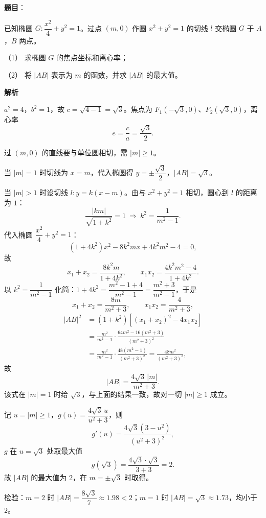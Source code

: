 \begin{answer}

\textbf{题目}：

已知椭圆 $G:\dfrac{x^2}{4}+y^2=1$。过点 $(m,0)$ 作圆 $x^2+y^2=1$ 的切线 $l$ 交椭圆 $G$ 于 $A$，$B$ 两点。

（1） 求椭圆 $G$ 的焦点坐标和离心率；

（2） 将 $|AB|$ 表示为 $m$ 的函数，并求 $|AB|$ 的最大值。

\textbf{解析}


$a^2=4$，$b^2=1$，故 $c=\sqrt{4-1}=\sqrt3$。焦点为 $F_1(-\sqrt3,0)$、$F_2(\sqrt3,0)$，离心率
\nopagebreak[4]
\[
e=\frac ca=\frac{\sqrt3}{2}.
\]


过 $(m,0)$ 的直线要与单位圆相切，需 $|m|\geqslant1$。

当 $|m|=1$ 时切线为 $x=m$，代入椭圆得 $y=\pm\dfrac{\sqrt3}{2}$，$|AB|=\sqrt3$。

当 $|m|>1$ 时设切线 $l:y=k(x-m)$。由与 $x^2+y^2=1$ 相切，圆心到 $l$ 的距离为 $1$：
\nopagebreak[4]
\[
\frac{|km|}{\sqrt{1+k^2}}=1\ \Longrightarrow\ k^2=\frac1{m^2-1}.
\]
代入椭圆 $\dfrac{x^2}{4}+y^2=1$：
\nopagebreak[4]
\[
\left(1+4k^2\right)x^2-8k^2mx+4k^2m^2-4=0,
\]
故
\nopagebreak[4]
\[
x_1+x_2=\frac{8k^2m}{1+4k^2},\qquad x_1x_2=\frac{4k^2m^2-4}{1+4k^2}.
\]
以 $k^2=\dfrac1{m^2-1}$ 化简：$1+4k^2=\dfrac{m^2-1+4}{m^2-1}=\dfrac{m^2+3}{m^2-1}$，于是
\nopagebreak[4]
\[
x_1+x_2=\frac{8m}{m^2+3},\qquad x_1x_2=\frac{4}{m^2+3},
\]
\nopagebreak[4]
\[
\begin{aligned}
|AB|^2&=(1+k^2)\left[(x_1+x_2)^2-4x_1x_2\right]\\
&=\frac{m^2}{m^2-1}\cdot\frac{64m^2-16(m^2+3)}{(m^2+3)^2}\\
&=\frac{m^2}{m^2-1}\cdot\frac{48(m^2-1)}{(m^2+3)^2}
=\frac{48m^2}{(m^2+3)^2},
\end{aligned}
\]
故
\nopagebreak[4]
\[
|AB|=\frac{4\sqrt3\,|m|}{m^2+3}.
\]
该式在 $|m|=1$ 时给 $\sqrt3$，与上面的结果一致，故对一切 $|m|\geqslant1$ 成立。

记 $u=|m|\geqslant1$，$g(u)=\dfrac{4\sqrt3\,u}{u^2+3}$，则
\nopagebreak[4]
\[
g'(u)=\frac{4\sqrt3\left(3-u^2\right)}{(u^2+3)^2},
\]
$g$ 在 $u=\sqrt3$ 处取最大值
\nopagebreak[4]
\[
g(\sqrt3)=\frac{4\sqrt3\cdot\sqrt3}{3+3}=2.
\]
故 $|AB|$ 的最大值为 $2$，在 $m=\pm\sqrt3$ 时取得。

检验：$m=2$ 时 $|AB|=\dfrac{8\sqrt3}{7}\approx1.98<2$；$m=1$ 时 $|AB|=\sqrt3\approx1.73$，均小于 $2$。



\end{answer}
